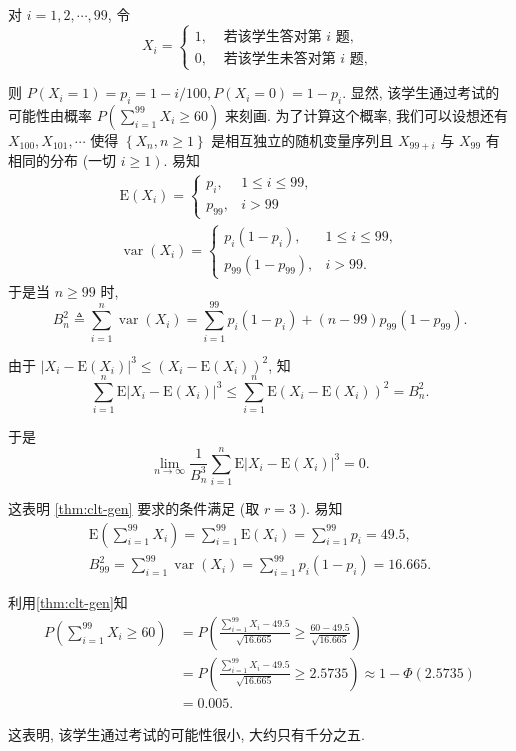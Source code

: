      \begin{solution}
        对 $i=1,2, \cdots, 99$, 令
$$
X_i= \begin{cases}1, & \text { 若该学生答对第 } i \text { 题, } \\ 0, & \text { 若该学生未答对第 } i \text { 题, }\end{cases}
$$

则 $P\left(X_i=1\right)=p_i=1-i / 100, P\left(X_i=0\right)=1-p_i$.
显然, 该学生通过考试的可能性由概率 $P\left(\sum_{i=1}^{99} X_i \geqslant 60\right)$ 来刻画. 为了计算这个概率, 我们可以设想还有 $X_{100}, X_{101}, \cdots$ 使得 $\left\{X_n, n \geqslant 1\right\}$ 是相互独立的随机变量序列且 $X_{99+i}$ 与 $X_{99}$ 有相同的分布 (一切 $\left.i \geqslant 1\right)$. 易知
$$
\begin{gathered}
\mathrm{E}\left(X_i\right)= \begin{cases}p_i, & 1 \leq i \leq 99, \\
p_{99}, & i>99\end{cases} \\
\operatorname{var}\left(X_i\right)= \begin{cases}p_i\left(1-p_i\right), & 1 \leq i \leq 99, \\
p_{99}\left(1-p_{99}\right), & i>99 .\end{cases}
\end{gathered}
$$
于是当 $n \geqslant 99$ 时,
$$
B_n^2 \triangleq \sum_{i=1}^n \operatorname{var}\left(X_i\right)=\sum_{i=1}^{99} p_i\left(1-p_i\right)+(n-99) p_{99}\left(1-p_{99}\right) .
$$

由于 $\left|X_i-\mathrm{E}\left(X_i\right)\right|^3 \leq\left(X_i-\mathrm{E}\left(X_i\right)\right)^2$, 知
$$
\sum_{i=1}^n \mathrm{E}\left|X_i-\mathrm{E}\left(X_i\right)\right|^3 \leq \sum_{i=1}^n \mathrm{E}\left(X_i-\mathrm{E}\left(X_i\right)\right)^2=B_n^2 .
$$

于是$$
\lim _{n \rightarrow \infty} \frac{1}{B_n^3} \sum_{i=1}^n \mathrm{E}\left|X_i-\mathrm{E}\left(X_i\right)\right|^3=0 .
$$

这表明 \cref{thm:clt-gen} 要求的条件满足 (取 $r=3$ ). 易知
$$
\begin{gathered}
\mathrm{E}\left(\sum_{i=1}^{99} X_i\right)=\sum_{i=1}^{99} \mathrm{E}\left(X_i\right)=\sum_{i=1}^{99} p_i=49.5, \\
B_{99}^2=\sum_{i=1}^{99} \operatorname{var}\left(X_i\right)=\sum_{i=1}^{99} p_i\left(1-p_i\right)=16.665 .
\end{gathered}
$$

利用\cref{thm:clt-gen}知
$$
\begin{aligned}
P\left(\sum_{i=1}^{99} X_i \geqslant 60\right)&=P\left(\frac{\sum_{i=1}^{99} X_i-49.5}{\sqrt{16.665}} \geqslant \frac{60-49.5}{\sqrt{16.665}}\right)  \\
& =P\left(\frac{\sum_{i=1}^{99} X_i-49.5}{\sqrt{16.665}} \geqslant 2.5735\right) \approx 1-\Phi(2.5735) \\
& =0.005 .
\end{aligned}
$$

这表明, 该学生通过考试的可能性很小, 大约只有千分之五.
     \end{solution}